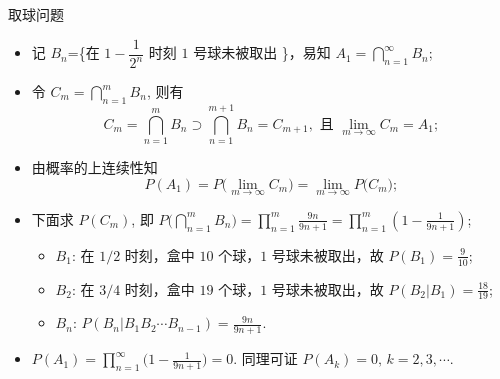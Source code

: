 \begin{frame}{取球问题}
	\begin{itemize}[<+-|alert@+>]
	\item 记 $B_n$=\{在 $1-\dfrac{1}{2^n}$ 时刻 $1$ 号球未被取出 \}，\pause 易知 $A_1=\bigcap\limits_{n=1}^{\infty} B_n$;\pause
	\item 令 $C_m=\bigcap\limits_{n=1}^{m} B_n$, 则有 \pause
	\[C_m=\bigcap\limits_{n=1}^{m} B_n\supset\bigcap\limits_{n=1}^{m+1} B_n=C_{m+1},\mbox{ 且 } \lim_{m\rightarrow\infty} C_m=A_1;\]\pause
	\item 由概率的上连续性知 $$ P (A_1)= P\big (\lim_{m\rightarrow\infty} C_m\big)=\lim_{m\rightarrow\infty} P\big (C_m\big);$$
	\item 下面求 $P (C_m)$, 即 $P\big (\bigcap_{n=1}^{m} B_n\big)=\prod_{n=1}^{m}\frac{9n}{9n+1}=\prod_{n=1}^{m}\left (1-\frac{1}{9n+1}\right)$;
	\begin{itemize}[<+-|alert@+>]
		\item $B_1$: 在 $1/2$ 时刻，盒中 $10$ 个球，$1$ 号球未被取出，故 \pause $ P (B_1)=\frac{9}{10}$;\pause
		\item $B_2$: 在 $3/4$ 时刻，盒中 $19$ 个球，$1$ 号球未被取出，故 \pause $ P (B_2|B_1)=\frac{18}{19}$;\pause
		\item $B_n$: $ P(B_n|B_1B_2\cdots B_{n-1})=\frac{9n}{9n+1}.$
	\end{itemize}
\item $ P (A_1)=\prod_{n=1}^{\infty}\big (1-\frac{1}{9n+1}\big)=0.$ 同理可证 $ P (A_k)=0,\,k=2,3,\cdots$.
\end{itemize} %



\end{frame}


